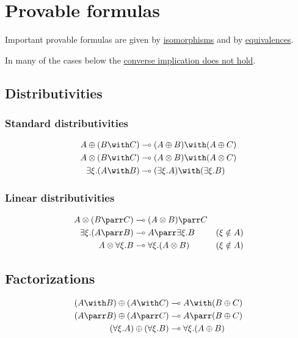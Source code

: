 \section{Provable formulas}\label{provable-formulas}

Important provable formulas are given by
\hyperref[list-of-isomorphisms]{isomorphisms} and by
\hyperref[list-of-equivalences]{equivalences}.

In many of the cases below the \hyperref[non-provable-formulas]{converse implication does not hold}.

\subsection{Distributivities}\label{distributivities}

\subsubsection{Standard distributivities}\label{standard-distributivities}
\begin{align*}
A\plus (B\with C) &\limp (A\plus B)\with (A\plus C) \\
A\tens (B\with C) &\limp (A\tens B)\with (A\tens C) \\
\exists \xi . (A \with B) &\limp (\exists \xi . A) \with (\exists \xi . B)
\end{align*}

\subsubsection{Linear distributivities}\label{linear-distributivities}
\begin{align*}
A\tens (B\parr C) &\limp (A\tens B)\parr C \\
\exists \xi. (A \parr B) &\limp A \parr \exists \xi.B  & (\xi\notin A) \\
A \tens \forall \xi.B &\limp \forall \xi. (A \tens B) &  (\xi\notin A) \\
\end{align*}

\subsection{Factorizations}\label{factorizations}
\begin{align*}
(A\with B)\plus (A\with C) &\limp A\with (B\plus C) \\
(A\parr B)\plus (A\parr C) &\limp A\parr (B\plus C) \\
(\forall \xi . A) \plus (\forall \xi . B) &\limp \forall \xi . (A \plus B)
\end{align*}

